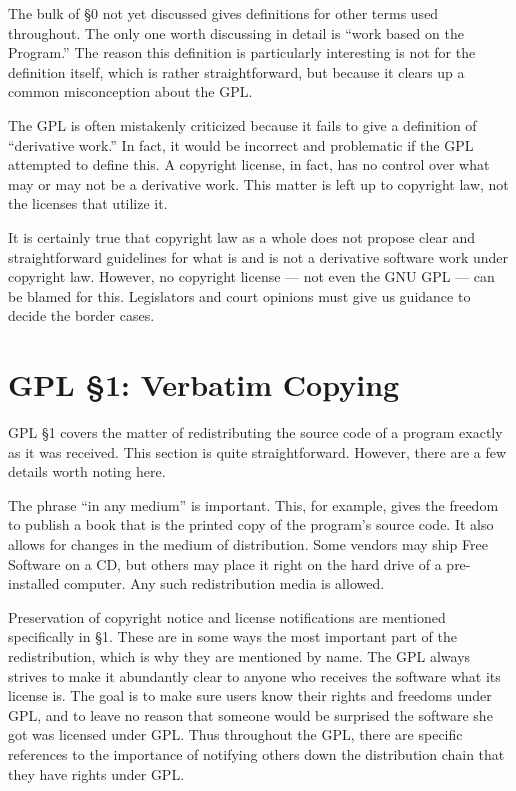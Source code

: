 \documentclass[11pt, letterpaper]{book}
\begin{document}
\medskip

The bulk of \S 0 not yet discussed gives definitions for other terms used
throughout. The only one worth discussing in detail is ``work based on
the Program.''  The reason this definition is particularly interesting is
not for the definition itself, which is rather straightforward, but
because it clears up a common misconception about the GPL\@.

The GPL is often mistakenly criticized because it fails to give a
definition of ``derivative work.''  In fact, it would be incorrect and
problematic if the GPL attempted to define this. A copyright license, in
fact, has no control over what may or may not be a derivative work. This
matter is left up to copyright law, not the licenses that utilize it.

It is certainly true that copyright law as a whole does not propose clear
and straightforward guidelines for what is and is not a derivative
software work under copyright law. However, no copyright license --- not
even the GNU GPL --- can be blamed for this. Legislators and court
opinions must give us guidance to decide the border cases.

\section{GPL \S 1: Verbatim Copying}
\label{GPLs1}

GPL \S 1 covers the matter of redistributing the source code of a program
exactly as it was received. This section is quite straightforward.
However, there are a few details worth noting here.

The phrase ``in any medium'' is important. This, for example, gives the
freedom to publish a book that is the printed copy of the program's source
code. It also allows for changes in the medium of distribution. Some
vendors may ship Free Software on a CD, but others may place it right on
the hard drive of a pre-installed computer. Any such redistribution media
is allowed.

Preservation of copyright notice and license notifications are mentioned
specifically in \S 1. These are in some ways the most important part of
the redistribution, which is why they are mentioned by name. The GPL
always strives to make it abundantly clear to anyone who receives the
software what its license is. The goal is to make sure users know their
rights and freedoms under GPL, and to leave no reason that someone would be
surprised the software she got was licensed under GPL\@. Thus
throughout the GPL, there are specific references to the importance of
notifying others down the distribution chain that they have rights under
GPL.
\end{document}
